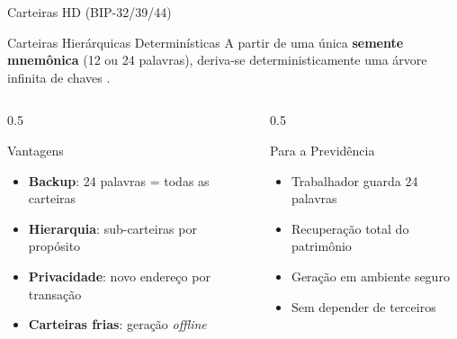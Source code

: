 \documentclass{libs/ufc_format}
\begin{document}
\begin{frame}{Carteiras HD (BIP-32/39/44)}
    \begin{block}{Carteiras Hierárquicas Determinísticas}
        A partir de uma única \textbf{semente mnemônica} (12 ou 24 palavras), deriva-se deterministicamente uma árvore infinita de chaves \cite{bip32, bip39}.
    \end{block}

    \vspace{0.3cm}

    \begin{columns}
        \begin{column}{0.5\textwidth}
            \begin{exampleblock}{Vantagens}
                \begin{itemize}
                    \item \textbf{Backup}: 24 palavras = todas as carteiras
                    \item \textbf{Hierarquia}: sub-carteiras por propósito
                    \item \textbf{Privacidade}: novo endereço por transação
                    \item \textbf{Carteiras frias}: geração \textit{offline}
                \end{itemize}
            \end{exampleblock}
        \end{column}
        \begin{column}{0.5\textwidth}
            \begin{alertblock}{Para a Previdência}
                \begin{itemize}
                    \item Trabalhador guarda 24 palavras
                    \item Recuperação total do patrimônio
                    \item Geração em ambiente seguro \cite{coleman2015}
                    \item Sem depender de terceiros
                \end{itemize}
            \end{alertblock}
        \end{column}
    \end{columns}
\end{frame}

\end{document}
